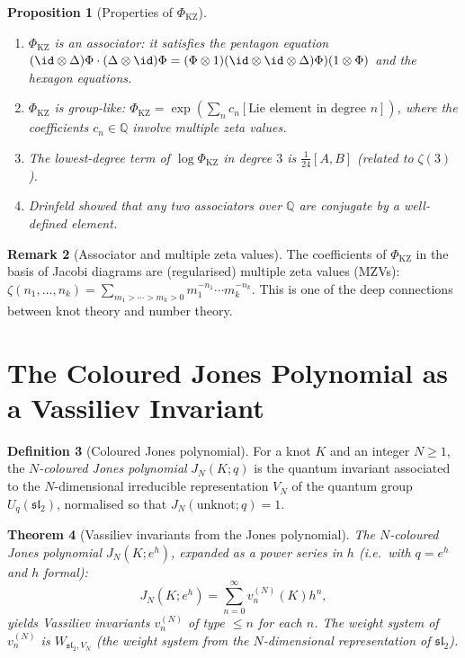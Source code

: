 \documentclass[12pt,a4paper]{amsart}
\newtheorem{theorem}{Theorem}[section]
\newtheorem{proposition}[theorem]{Proposition}
\theoremstyle{definition}
\newtheorem{definition}[theorem]{Definition}
\newtheorem{remark}[theorem]{Remark}
\newcommand{\Q}{\mathbb{Q}}
\begin{document}
\begin{proposition}[Properties of $\Phi_{\mathrm{KZ}}$]
\begin{enumerate}[label=(\roman*)]
  \item $\Phi_{\mathrm{KZ}}$ is an associator: it satisfies the pentagon
        equation
        $(\id \otimes \Delta) \Phi \cdot (\Delta \otimes \id) \Phi =
         (\Phi \otimes 1)({\id \otimes \id \otimes \Delta)}\Phi)(1 \otimes \Phi)$
        and the hexagon equations.
  \item $\Phi_{\mathrm{KZ}}$ is group-like: $\Phi_{\mathrm{KZ}} = \exp(\sum_n c_n [\text{Lie element in degree } n])$, where the coefficients $c_n \in \Q$ involve multiple zeta values.
  \item The lowest-degree term of $\log \Phi_{\mathrm{KZ}}$ in degree $3$
        is $\frac{1}{24}[A, B]$ (related to $\zeta(3)$).
  \item Drinfeld showed that any two associators over $\Q$ are conjugate
        by a well-defined element.
\end{enumerate}
\end{proposition}

\begin{remark}[Associator and multiple zeta values]
The coefficients of $\Phi_{\mathrm{KZ}}$ in the basis of Jacobi diagrams
are (regularised) multiple zeta values (MZVs):
$\zeta(n_1, \ldots, n_k) = \sum_{m_1 > \cdots > m_k > 0} m_1^{-n_1} \cdots m_k^{-n_k}$.
This is one of the deep connections between knot theory and number theory.
\end{remark}

\section{The Coloured Jones Polynomial as a Vassiliev Invariant}\label{sec:jones}

\begin{definition}[Coloured Jones polynomial]
For a knot $K$ and an integer $N \geq 1$, the \emph{$N$-coloured Jones
polynomial} $J_N(K; q)$ is the quantum invariant associated to the
$N$-dimensional irreducible representation $V_N$ of the quantum group
$U_q(\mathfrak{sl}_2)$, normalised so that $J_N(\text{unknot}; q) = 1$.
\end{definition}

\begin{theorem}[Vassiliev invariants from the Jones polynomial]
\label{thm:jones_vassiliev}
The $N$-coloured Jones polynomial $J_N(K;e^h)$, expanded as a power series
in $h$ (i.e.\ with $q = e^h$ and $h$ formal):
\[
  J_N(K; e^h) = \sum_{n=0}^\infty v_n^{(N)}(K) h^n,
\]
yields Vassiliev invariants $v_n^{(N)}$ of type $\leq n$ for each $n$.
The weight system of $v_n^{(N)}$ is $W_{\mathfrak{sl}_2, V_N}$
(the weight system from the $N$-dimensional representation of $\mathfrak{sl}_2$).
\end{theorem}
\end{document}
